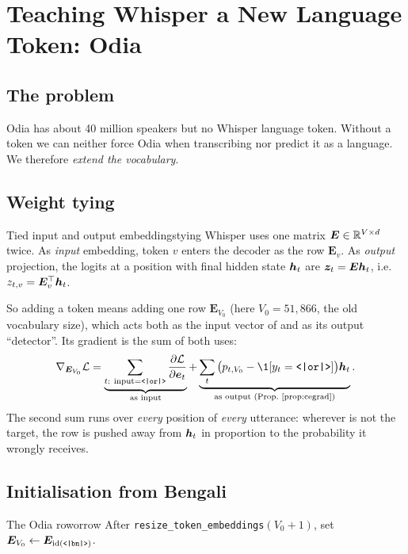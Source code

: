 \chapter{Teaching Whisper a New Language Token: Odia}
\label{ch:odia}

\section{The problem}

Odia has about 40 million speakers but no Whisper language token. Without a token we can neither force Odia when transcribing nor
predict it as a language. We therefore \emph{extend the vocabulary}.

\section{Weight tying}

\begin{definition}{Tied input and output embeddings}{tying}
Whisper uses one matrix $\bm E\in\mathbb{R}^{V\times d}$ twice. As \emph{input} embedding, token $v$ enters the decoder as the row
$\bm E_v$. As \emph{output} projection, the logits at a position with final hidden state $\bm{h}_t$ are $\bm{z}_t=\bm E\bm{h}_t$, i.e.\
$z_{t,v}=\bm E_v^\top\bm{h}_t$.
\end{definition}

So adding a token means adding one row $\bm E_{V_0}$ (here $V_0=51{,}866$, the old vocabulary size), which acts both as the input
vector of \tok{or} and as its output ``detector''. Its gradient is the sum of both uses:
\[
\nabla_{\bm E_{V_0}}\mathcal L=\underbrace{\sum_{t:\ \text{input}=\tok{or}}\frac{\partial\mathcal L}{\partial\bm e_t}}_{\text{as input}}
+\underbrace{\sum_t\big(p_{t,V_0}-\1[y_t=\tok{or}]\big)\vh_t}_{\text{as output (Prop.~\ref{prop:cegrad})}} .
\]
The second sum runs over \emph{every} position of \emph{every} utterance: wherever  is not the target, the row is pushed away
from $\bm{h}_t$ in proportion to the probability it wrongly receives.

\section{Initialisation from Bengali}

\begin{definition}{The Odia row}{orrow}
After \texttt{resize\_token\_embeddings}$(V_0+1)$, set $\bm E_{V_0}\leftarrow\bm E_{\mathrm{id}(\tok{bn})}$.
\end{definition}

